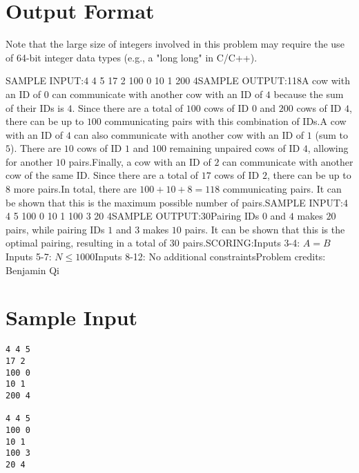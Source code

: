 \documentclass[12pt]{article}
\begin{document}
\section*{Output Format}
Note that the large size of integers involved in this problem may require the
use of 64-bit integer data types (e.g., a "long long" in C/C++).

SAMPLE INPUT:4 4 5
17 2
100 0
10 1
200 4SAMPLE OUTPUT:118A cow with an ID of $0$ can communicate with another cow with an ID of $4$
because the sum of their IDs is $4$.  Since there are a total of $100$ cows of
ID $0$ and $200$ cows of ID $4$,  there can be up to $100$ communicating pairs
with this combination of IDs.A cow with an ID of $4$ can also communicate with another cow with an ID of $1$
(sum to $5$). There are $10$ cows of ID $1$ and $100$ remaining unpaired cows of
ID $4$, allowing for another $10$ pairs.Finally, a cow with an ID of $2$ can communicate with another cow of the same
ID.  Since there are a total of $17$ cows of ID $2$, there can be up to $8$ more
pairs.In total, there are $100+10+8=118$ communicating pairs. It can be shown that
this is the maximum possible number of pairs.SAMPLE INPUT:4 4 5
100 0
10 1
100 3
20 4SAMPLE OUTPUT:30Pairing IDs $0$ and $4$ makes $20$ pairs, while pairing IDs $1$ and $3$ makes
$10$ pairs. It can be shown that this is the optimal pairing, resulting in a
total of $30$ pairs.SCORING:Inputs 3-4: $A=B$Inputs 5-7: $N\le 1000$Inputs 8-12: No additional constraintsProblem credits: Benjamin Qi

\section*{Sample Input}
\begin{verbatim}
4 4 5
17 2
100 0
10 1
200 4

4 4 5
100 0
10 1
100 3
20 4
\end{verbatim}
\end{document}
